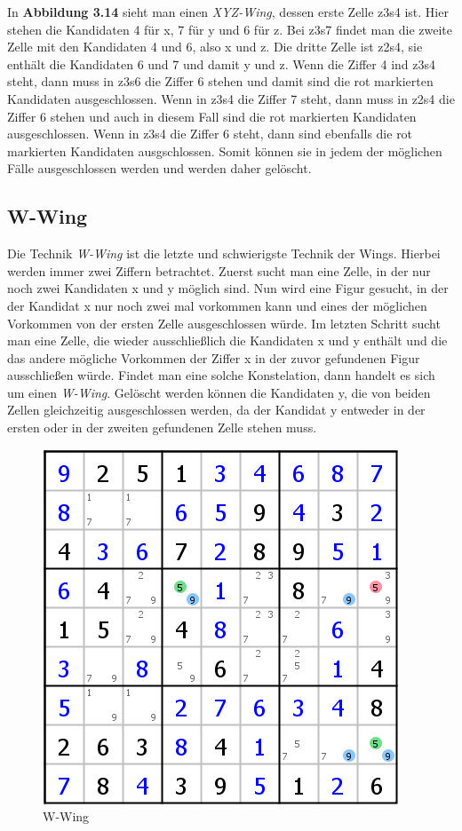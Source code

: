 \documentclass[accentcolor=tud6b,11pt,paper=a4]{tudreport}
\begin{document}
In \textbf{Abbildung 3.14} sieht man einen \textit{XYZ-Wing}, dessen erste Zelle z3s4 ist. Hier stehen die Kandidaten 4 für x, 7 für y und 6 für z. Bei z3s7 findet man die zweite Zelle mit den Kandidaten 4 und 6, also x und z. Die dritte Zelle ist z2s4, sie enthält die Kandidaten 6 und 7 und damit y und z. Wenn die Ziffer 4 ind z3s4 steht, dann muss in z3s6 die Ziffer 6 stehen und damit sind die rot markierten Kandidaten ausgeschlossen. Wenn in z3s4 die Ziffer 7 steht, dann muss in z2s4 die Ziffer 6 stehen und auch in diesem Fall sind die rot markierten Kandidaten ausgeschlossen. Wenn in z3s4 die Ziffer 6 steht, dann sind ebenfalls die rot markierten Kandidaten ausgschlossen. Somit können sie in jedem der möglichen Fälle ausgeschlossen werden und werden daher gelöscht.

\newpage
\subsection{W-Wing}
Die Technik \textit{W-Wing} ist die letzte und schwierigste Technik der Wings. Hierbei werden immer zwei Ziffern betrachtet. Zuerst sucht man eine Zelle, in der nur noch zwei Kandidaten x und y möglich sind. Nun wird eine Figur gesucht, in der der Kandidat x nur noch zwei mal vorkommen kann und eines der möglichen Vorkommen von der ersten Zelle ausgeschlossen würde. Im letzten Schritt sucht man eine Zelle, die wieder ausschließlich die Kandidaten x und y enthält und die das andere mögliche Vorkommen der Ziffer x in der zuvor gefundenen Figur ausschließen würde. Findet man eine solche Konstelation, dann handelt es sich um einen \textit{W-Wing}. Gelöscht werden können die  Kandidaten y, die von beiden Zellen gleichzeitig ausgeschlossen werden, da der Kandidat y entweder in der ersten oder in der zweiten gefundenen Zelle stehen muss.

\begin{figure}[h]
\begin{center}
\includegraphics{./img/W_Wing.png}
\caption{W-Wing}
\end{center}
\end{figure}
\end{document}
